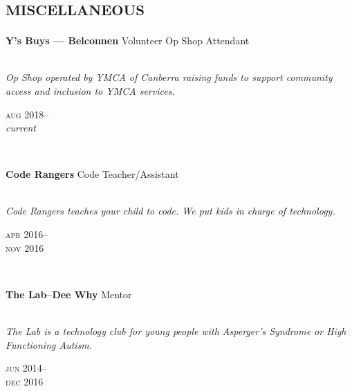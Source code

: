 

\section*{\textsc{miscellaneous}}
\vspace{-0.2cm}

\begin{minipage}[t]{0.75\textwidth}
\textbf{Y's Buys — Belconnen}\phantom{..} Volunteer Op Shop Attendant\\
\\
{\small
\textit{Op Shop operated by YMCA of Canberra raising funds to support community access and inclusion to YMCA services.}
\par}
\end{minipage}
\begin{minipage}[t]{0.25\textwidth}
{
\hfill \textsc{aug} 2018--\\ 
\hspace*{0pt} \hfill \textit{current}
\par
}
\end{minipage}
\\

\begin{minipage}[t]{0.75\textwidth}
\textbf{Code Rangers}\phantom{..} Code Teacher/Assistant \\
\\
{\small
\textit{Code Rangers teaches your child to code. We put kids in charge of technology.}
\par}
\end{minipage}
\begin{minipage}[t]{0.25\textwidth}
{
\hfill \textsc{apr} 2016--\\ 
\hspace*{0pt} \hfill \textsc{nov} 2016
\par
}
\end{minipage}
\\

\begin{minipage}[t]{0.75\textwidth}
\textbf{The Lab--Dee Why}\phantom{..} Mentor \\
\\
{\small
\textit{The Lab is a technology club for young people with Asperger’s Syndrome or High Functioning Autism.}
\par}
\end{minipage}
\begin{minipage}[t]{0.25\textwidth}
{
\hfill \textsc{jun} 2014--\\ 
\hspace*{0pt} \hfill \textsc{dec} 2016
\par
}
\end{minipage}
\\

